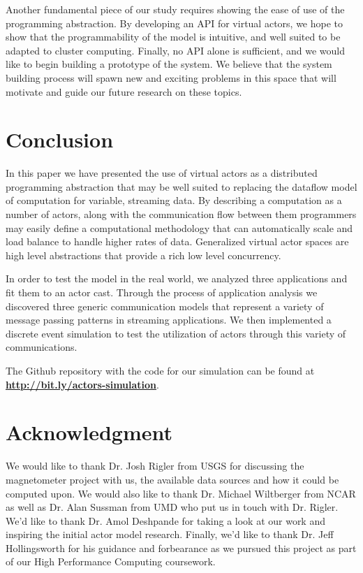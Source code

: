 \documentclass[conference,twocolumn,10pt]{IEEEtran}
\newcommand{\bennote}[1]{\textcolor{magenta}{\bf #1}}
\begin{document}
Another fundamental piece of our study requires showing the ease of use of the programming abstraction. By developing an API for virtual actors, we hope to show that the programmability of the model is intuitive, and well suited to be adapted to cluster computing. Finally, no API alone is sufficient, and we would like to begin building a prototype of the system. We believe that the system building process will spawn new and exciting problems in this space that will motivate and guide our future research on these topics.

\section{Conclusion}

In this paper we have presented the use of virtual actors as a distributed programming abstraction that may be well suited to replacing the dataflow model of computation for variable, streaming data. By describing a computation as a number of actors, along with the communication flow between them programmers may easily define a computational methodology that can automatically scale and load balance to handle higher rates of data. Generalized virtual actor spaces are high level abstractions that provide a rich low level concurrency.

In order to test the model in the real world, we analyzed three applications and fit them to an actor cast. Through the process of application analysis we discovered three generic communication models that represent a variety of message passing patterns in streaming applications. We then implemented a discrete event simulation to test the utilization of actors through this variety of communications.


The Github repository with the code for our simulation can be found at \bennote{\url{http://bit.ly/actors-simulation}}.



\section*{Acknowledgment}
We would like to thank Dr. Josh Rigler from USGS for discussing the magnetometer project with us, the available data sources and how it could be computed upon. We would also like to thank Dr. Michael Wiltberger from NCAR as well as Dr. Alan Sussman from UMD who put us in touch with Dr. Rigler. We'd like to thank Dr. Amol Deshpande for taking a look at our work and inspiring the initial actor model research. Finally, we'd like to thank Dr. Jeff Hollingsworth for his guidance and forbearance as we pursued this project as part of our High Performance Computing coursework.

\newpage






\end{document}
